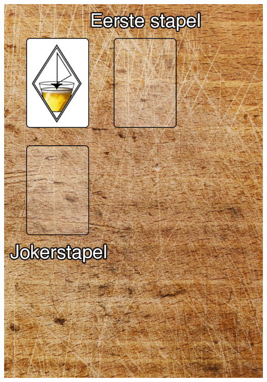 \begin{minipage}[t]{.48\textwidth}
\includegraphics[width=1\textwidth]{img/FritsPlank_Opening.png}
\end{minipage}
\hfill \vrule  \hspace{0.20cm}
